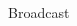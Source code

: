 \begin{frame}[fragile]{Broadcast}
\begin{multicols}{2}
\begin{figure}[H]
    
    

\end{figure}
\end{multicols}
\end{frame}
